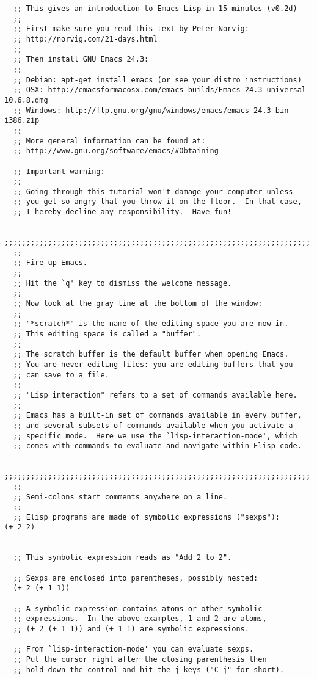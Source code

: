\documentclass[11pt]{ctexart}
\begin{document}
{{{{\begin{lstlisting}
  ;; This gives an introduction to Emacs Lisp in 15 minutes (v0.2d)
  ;;
  ;; First make sure you read this text by Peter Norvig:
  ;; http://norvig.com/21-days.html
  ;;
  ;; Then install GNU Emacs 24.3:
  ;;
  ;; Debian: apt-get install emacs (or see your distro instructions)
  ;; OSX: http://emacsformacosx.com/emacs-builds/Emacs-24.3-universal-10.6.8.dmg
  ;; Windows: http://ftp.gnu.org/gnu/windows/emacs/emacs-24.3-bin-i386.zip
  ;;
  ;; More general information can be found at:
  ;; http://www.gnu.org/software/emacs/#Obtaining

  ;; Important warning:
  ;;
  ;; Going through this tutorial won't damage your computer unless
  ;; you get so angry that you throw it on the floor.  In that case,
  ;; I hereby decline any responsibility.  Have fun!

  ;;;;;;;;;;;;;;;;;;;;;;;;;;;;;;;;;;;;;;;;;;;;;;;;;;;;;;;;;;;;;;;;;;;;;;;;
  ;;
  ;; Fire up Emacs.
  ;;
  ;; Hit the `q' key to dismiss the welcome message.
  ;;
  ;; Now look at the gray line at the bottom of the window:
  ;;
  ;; "*scratch*" is the name of the editing space you are now in.
  ;; This editing space is called a "buffer".
  ;;
  ;; The scratch buffer is the default buffer when opening Emacs.
  ;; You are never editing files: you are editing buffers that you
  ;; can save to a file.
  ;;
  ;; "Lisp interaction" refers to a set of commands available here.
  ;;
  ;; Emacs has a built-in set of commands available in every buffer,
  ;; and several subsets of commands available when you activate a
  ;; specific mode.  Here we use the `lisp-interaction-mode', which
  ;; comes with commands to evaluate and navigate within Elisp code.

  ;;;;;;;;;;;;;;;;;;;;;;;;;;;;;;;;;;;;;;;;;;;;;;;;;;;;;;;;;;;;;;;;;;;;;;;;
  ;;
  ;; Semi-colons start comments anywhere on a line.
  ;;
  ;; Elisp programs are made of symbolic expressions ("sexps"):
(+ 2 2)


  ;; This symbolic expression reads as "Add 2 to 2".

  ;; Sexps are enclosed into parentheses, possibly nested:
  (+ 2 (+ 1 1))

  ;; A symbolic expression contains atoms or other symbolic
  ;; expressions.  In the above examples, 1 and 2 are atoms,
  ;; (+ 2 (+ 1 1)) and (+ 1 1) are symbolic expressions.

  ;; From `lisp-interaction-mode' you can evaluate sexps.
  ;; Put the cursor right after the closing parenthesis then
  ;; hold down the control and hit the j keys ("C-j" for short).


\end{lstlisting}}}}}
\end{document}
